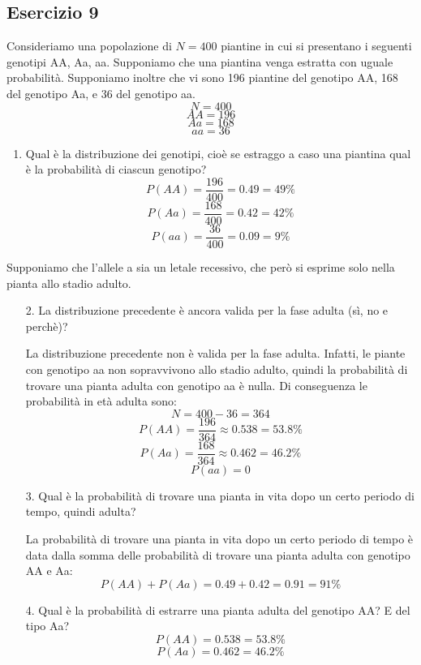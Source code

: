 \documentclass[a4paper]{article}
\theoremstyle{break}
\theoremstyle{break}
\theoremstyle{break}
\theoremstyle{break}
\begin{document}
\subsection{Esercizio 9}
Consideriamo una popolazione di \( N = 400 \) piantine in cui si presentano i seguenti
genotipi AA, Aa, aa. Supponiamo che una piantina venga estratta con uguale probabilità.
Supponiamo inoltre che vi sono 196 piantine del genotipo AA, 168 del genotipo Aa, e 36
del genotipo aa.
\[
	N = 400
\]
\[
	AA = 196
\]
\[
	Aa = 168
\]
\[
	aa = 36
\]
\begin{enumerate}
	\item Qual è la distribuzione dei genotipi, cioè se estraggo a caso una piantina qual
	      è la probabilità di ciascun genotipo?
	      \[
		      P(AA) = \frac{196}{400} = 0.49 = 49\%
	      \]
	      \[
		      P(Aa) = \frac{168}{400} = 0.42 = 42\%
	      \]
	      \[
		      P(aa) = \frac{36}{400} = 0.09 = 9\%
	      \]
\end{enumerate}
Supponiamo che l’allele a sia un letale recessivo, che però si esprime solo nella pianta
allo stadio adulto.
\begin{enumerate}
	\item[2.] La distribuzione precedente è ancora valida per la fase adulta (sì, no
	      e perchè)?

	      \vspace{1em}
	      \noindent La distribuzione precedente non è valida per la fase adulta. Infatti,
	      le piante con genotipo aa non sopravvivono allo stadio adulto, quindi la probabilità
	      di trovare una pianta adulta con genotipo aa è nulla. Di conseguenza le probabilità
	      in età adulta sono:
	      \[
		      N = 400 - 36 = 364
	      \]
	      \[
		      P(AA) = \frac{196}{364} \approx 0.538 = 53.8\%
	      \]
	      \[
		      P(Aa) = \frac{168}{364} \approx 0.462 = 46.2\%
	      \]
	      \[
		      P(aa) = 0
	      \]
	\item[3.] Qual è la probabilità di trovare una pianta in vita dopo un certo periodo di
	      tempo, quindi adulta?

	      \vspace{1em}
	      \noindent La probabilità di trovare una pianta in vita dopo un certo periodo di tempo
	      è data dalla somma delle probabilità di trovare una pianta adulta con genotipo AA e
	      Aa:
	      \[
		      P(AA) + P(Aa) = 0.49 + 0.42 = 0.91 = 91\%
	      \]
	\item[4.] Qual è la probabilità di estrarre una pianta adulta del genotipo AA? E del
	      tipo Aa?
	      \[
		      P(AA) = 0.538 = 53.8\%
	      \]
	      \[
		      P(Aa) = 0.462 = 46.2\%
	      \]
\end{enumerate}
\end{document}
